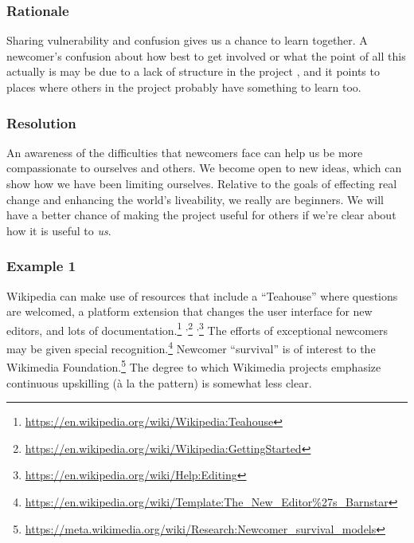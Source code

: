 %
\subsubsection*{Rationale} 
%
Sharing vulnerability and confusion gives us a chance to learn
together.  A newcomer's confusion about how best to get involved or
what the point of all this actually is may be due to a lack of
structure in the project , and it points to
places where others in the project probably have something to learn too.
%

\subsubsection*{Resolution}
An awareness of the difficulties that newcomers face can
help us be more compassionate to ourselves and others.  We
become open to new ideas, which can show how we have
been limiting ourselves.
%
Relative to the goals of effecting real change and enhancing the
world's liveability, we really are beginners.  We will have a better chance of making
the project useful for others if we're clear about how it is useful to \emph{us}.

\subsubsection*{Example 1} Wikipedia  can make use of resources that
include a ``Teahouse'' where questions are welcomed, a platform extension that changes the user
interface for new editors, and lots of documentation.\footnote{\url{https://en.wikipedia.org/wiki/Wikipedia:Teahouse}}%
\textsuperscript{,}\footnote{\url{https://en.wikipedia.org/wiki/Wikipedia:GettingStarted}}%
\textsuperscript{,}\footnote{\url{https://en.wikipedia.org/wiki/Help:Editing}}
The efforts of exceptional newcomers may be given special
recognition.\footnote{\url{https://en.wikipedia.org/wiki/Template:The_New_Editor\%27s_Barnstar}}
Newcomer ``survival'' is of interest to the Wikimedia
Foundation.\footnote{\url{https://meta.wikimedia.org/wiki/Research:Newcomer_survival_models}}
The degree to which Wikimedia projects emphasize continuous upskilling
(\`a la the  pattern) is somewhat less clear.

